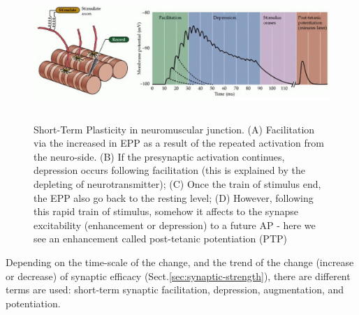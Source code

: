 \begin{figure}[hbt]
  \centerline{\includegraphics[height=5cm,
    angle=0]{./images/STplasticity.eps}}
\caption{Short-Term Plasticity in neuromuscular junction. (A) Facilitation
via the increased in EPP as a result of the repeated activation from the
neuro-side. (B) If the presynaptic activation continues, depression occurs
following facilitation (this is explained by the depleting of
neurotransmitter); (C) Once the train of stimulus end, the EPP also go back to
the resting level; (D) However, following this rapid train of stimulus, somehow
it affects to the synapse excitability (enhancement or depression) to a future
AP - here we see an enhancement called post-tetanic potentiation (PTP)}
\label{fig:STplasticity}
\end{figure}

Depending on the time-scale of the change, and the trend of the change
(increase or decrease) of synaptic efficacy (Sect.\ref{sec:synaptic-strength}),
there are different terms are used:
short-term synaptic facilitation, depression, augmentation, and potentiation.


